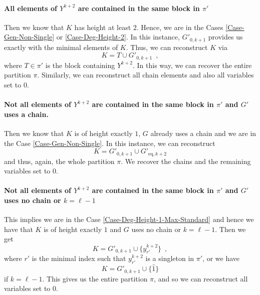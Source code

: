 \documentclass[12pt,a4paper]{amsart}
\theoremstyle{definition}
\begin{document}

\paragraph{ All elements of $Y^{{k+2}}$ are contained in the same block in $\pi'$}
Then we know that $K$ has height at least $2$. Hence, we are in the Cases \ref{Case-Gen-Non-Single} or \ref{Case-Deg-Height-2}.
In this instance, $G'_{0,k+1}$ provides us exactly with the minimal elements of $K$. Thus, we can reconstruct $K$ via
\begin{equation*}
  K=T\cup G'_{0,k+1} \enspace,
\end{equation*}
where $T\in\pi'$ is the block containing $Y^{k+2}$.  In this way, we can recover the entire partition $\pi$.
Similarly, we can reconstruct all chain elements and also all variables set to $0$. 

\paragraph{Not all elements of $Y^{{k+2}}$ are contained in the same block in $\pi'$ and $G'$ uses a chain.}
Then we know that $K$ is of height exactly $1$, $G$ already uses a chain and we are in the Case \ref{Case-Gen-Non-Single}.
In this instance, we can reconstruct
\begin{equation*}
  K=G'_{0,k+1}\cup G'_{\mathrm{eq},k+2}
\end{equation*}
and thus, again, the whole partition $\pi$. 
We recover the chains and the remaining variables set to $0$.
\paragraph{Not all elements of $Y^{{k+2}}$ are contained in the same block in $\pi'$ and $G'$ uses no chain or $k=\ell-1$}
This implies we are in the Case \ref{Case-Deg-Height-1-Max-Standard} and hence we have that $K$ is of height exactly $1$ and $G$ uses no chain or $k=\ell-1$.
Then we get
\begin{equation*}
  K=G'_{0,k+1}\cup\{y_{r'}^{{k+2}}\} \enspace ,
\end{equation*}
where $r'$ is the minimal index such that $y_{r'}^{{k+2}}$ is a singleton in $\pi'$, or we have
\begin{equation*}
  K=G'_{0,k+1}\cup\{\hat{1}\}
\end{equation*}
if $k=\ell-1$.
This gives us the entire partition $\pi$, and so we can reconstruct all variables set to $0$.
\end{document}

